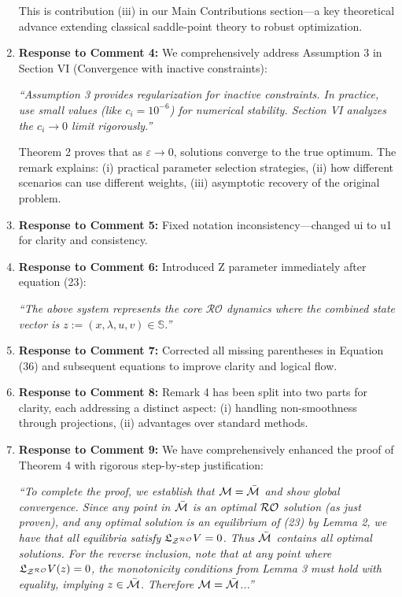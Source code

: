 \documentclass[journal,twoside,web]{ieeecolor}
\begin{document}
\begin{enumerate}
This is contribution (iii) in our Main Contributions section—a key theoretical advance extending classical saddle-point theory to robust optimization.

\item \textbf{Response to Comment 4:} We comprehensively address Assumption 3 in Section VI (Convergence with inactive constraints):

{\color{revisionblue}\textit{``Assumption 3 provides regularization for inactive constraints. In practice, use small values (like $c_i = 10^{-6}$) for numerical stability. Section VI analyzes the $c_i \to 0$ limit rigorously.''}}

Theorem 2 proves that as $\varepsilon \to 0$, solutions converge to the true optimum. The remark explains: (i) practical parameter selection strategies, (ii) how different scenarios can use different weights, (iii) asymptotic recovery of the original problem.

\item \textbf{Response to Comment 5:} Fixed notation inconsistency—changed ui to u1 for clarity and consistency.

\item \textbf{Response to Comment 6:} Introduced Z parameter immediately after equation (23):

{\color{revisionblue}\textit{``The above system represents the core $\mathcal{RO}$ dynamics where the combined state vector is $z:=(x,\lambda,u,v) \in \mathbb{S}$.''}}

\item \textbf{Response to Comment 7:} Corrected all missing parentheses in Equation (36) and subsequent equations to improve clarity and logical flow.

\item \textbf{Response to Comment 8:} Remark 4 has been split into two parts for clarity, each addressing a distinct aspect: (i) handling non-smoothness through projections, (ii) advantages over standard methods.

\item \textbf{Response to Comment 9:} We have comprehensively enhanced the proof of Theorem 4 with rigorous step-by-step justification:

{\color{revisionblue}\textit{``To complete the proof, we establish that ${\cal M} = \bar{\cal M}$ and show global convergence. Since any point in $\bar{\cal M}$ is an optimal ${\cal RO}$ solution (as just proven), and any optimal solution is an equilibrium of (23) by Lemma 2, we have that all equilibria satisfy $\mathfrak{L}_{{\cal Z}^{\cal RO}}V = 0$. Thus $\bar{\cal M}$ contains all optimal solutions. For the reverse inclusion, note that at any point where $\mathfrak{L}_{{\cal Z}^{\cal RO}}V(z) = 0$, the monotonicity conditions from Lemma 3 must hold with equality, implying $z \in \bar{\cal M}$. Therefore ${\cal M} = \bar{\cal M}$...''}}


\end{enumerate}
\end{document}
